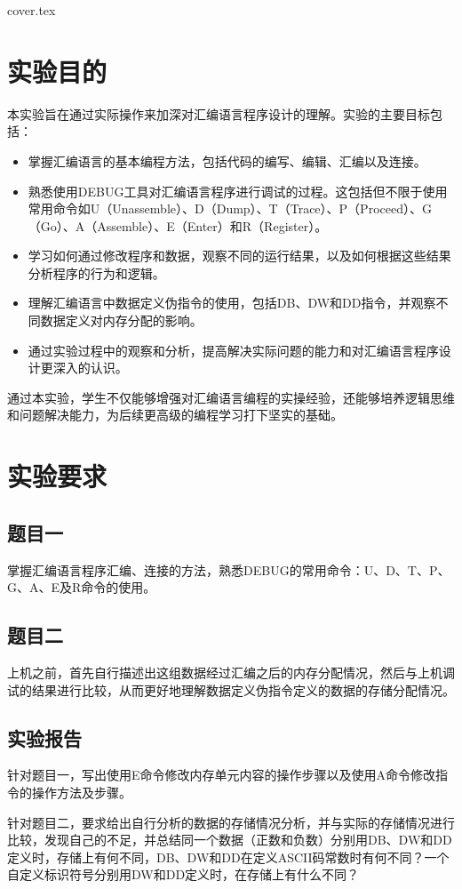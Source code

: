 \documentclass[12pt]{article}
\begin{document}
 {cover.tex}
\section{实验目的}

本实验旨在通过实际操作来加深对汇编语言程序设计的理解。实验的主要目标包括：
\begin{itemize}
    \item 掌握汇编语言的基本编程方法，包括代码的编写、编辑、汇编以及连接。
    \item 熟悉使用DEBUG工具对汇编语言程序进行调试的过程。这包括但不限于使用常用命令如U（Unassemble）、D（Dump）、T（Trace）、P（Proceed）、G（Go）、A（Assemble）、E（Enter）和R（Register）。
    \item 学习如何通过修改程序和数据，观察不同的运行结果，以及如何根据这些结果分析程序的行为和逻辑。
    \item 理解汇编语言中数据定义伪指令的使用，包括DB、DW和DD指令，并观察不同数据定义对内存分配的影响。
    \item 通过实验过程中的观察和分析，提高解决实际问题的能力和对汇编语言程序设计更深入的认识。
\end{itemize}

通过本实验，学生不仅能够增强对汇编语言编程的实操经验，还能够培养逻辑思维和问题解决能力，为后续更高级的编程学习打下坚实的基础。

\section{实验要求}
    \subsection{题目一}
    掌握汇编语言程序汇编、连接的方法，熟悉DEBUG的常用命令：U、D、T、P、G、A、E及R命令的使用。

    \subsection{题目二}
    上机之前，首先自行描述出这组数据经过汇编之后的内存分配情况，然后与上机调试的结果进行比较，从而更好地理解数据定义伪指令定义的数据的存储分配情况。

    \subsection{实验报告}
    针对题目一，写出使用E命令修改内存单元内容的操作步骤以及使用A命令修改指令的操作方法及步骤。
    
    针对题目二，要求给出自行分析的数据的存储情况分析，并与实际的存储情况进行比较，发现自己的不足，并总结同一个数据（正数和负数）分别用DB、DW和DD定义时，存储上有何不同，DB、DW和DD在定义ASCII码常数时有何不同？一个自定义标识符号分别用DW和DD定义时，在存储上有什么不同？
\end{document}
